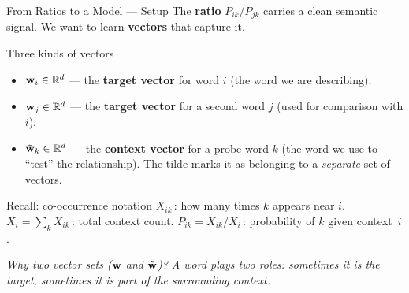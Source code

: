 \documentclass[11pt,aspectratio=169,professionalfonts]{beamer}
\begin{document}
\begin{frame}{From Ratios to a Model --- Setup}
  The \textbf{ratio} $P_{ik}/P_{jk}$ carries a clean semantic signal.
  We want to learn \textbf{vectors} that capture it.

  \vspace{2pt}
  \begin{block}{Three kinds of vectors}
    \begin{itemize}
      \item $\mathbf{w}_i \in \mathbb{R}^d$ --- the \textbf{target vector} for word $i$ (the word we are describing).
      \item $\mathbf{w}_j \in \mathbb{R}^d$ --- the \textbf{target vector} for a second word $j$ (used for comparison with $i$).
      \item $\tilde{\mathbf{w}}_k \in \mathbb{R}^d$ --- the \textbf{context vector} for a probe word $k$ (the word we use to ``test'' the relationship). The tilde marks it as belonging to a \emph{separate} set of vectors.
    \end{itemize}
  \end{block}

  \vspace{1pt}
  \begin{block}{Recall: co-occurrence notation}
    $X_{ik}$\,: how many times $k$ appears near $i$.\;
    $X_i = \sum_k X_{ik}$\,: total context count.\;
    $P_{ik} = X_{ik}/X_i$\,: probability of $k$ given context~$i$.
  \end{block}

  \vspace{1pt}
  {\small\textit{Why two vector sets ($\mathbf{w}$ and $\tilde{\mathbf{w}}$)?  A word plays two roles: sometimes it is the target, sometimes it is part of the surrounding context.}}
\end{frame}
%
%
\end{document}
